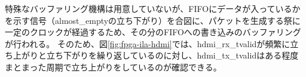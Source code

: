 
特殊なバッファリング機構は用意していないが、FIFOにデータが入っているかを示す信号（almost\_emptyの立ち下がり）を合図に、パケットを生成する祭に一定のクロックが経過するため、その分のFIFOへの書き込みのバッファリングが行われる。
そのため、図\ref{fig:fpga-ila-hdmi}では、hdmi\_rx\_tvalidが頻繁に立ち上がりと立ち下がりを繰り返しているのに対し、hdmi\_tx\_tvalidはある程度まとまった周期で立ち上がりをしているのが確認できる。
